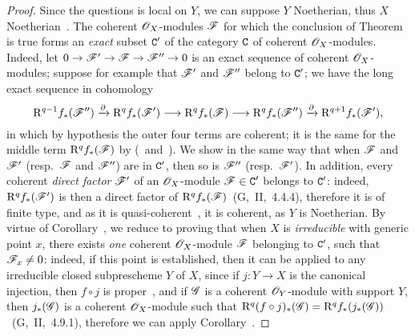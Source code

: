 \begin{proof}
Since the questions is local on $Y$, we can suppose $Y$ Noetherian, thus $X$ Noetherian~.
The coherent $\mathscr{O}_X$-modules $\mathscr{F}$ for which the conclusion of Theorem~ is true forms an \emph{exact} subset $\mathtt{C}'$ of the category $\mathtt{C}$ of coherent $\mathscr{O}_X$-modules.
Indeed, let $0\to\sh{F}'\to\sh{F}\to\sh{F}''\to 0$ is an exact sequence of coherent $\mathscr{O}_X$-modules; suppose for example that $\mathscr{F}'$ and $\mathscr{F}''$ belong to $\mathtt{C}'$; we have the long exact sequence in cohomology
\[
  \RR^{q-1}f_*(\sh{F}'')\xrightarrow{\partial}\RR^q f_*(\sh{F}')\to\RR^q f_*(\sh{F})\to\RR^q f_*(\sh{F}'')\xrightarrow{\partial}\RR^{q+1}f_*(\sh{F}'),
\]
in which by hypothesis the outer four terms are coherent; it is the same for the middle term $\mathrm{R}^q f_*(\mathscr{F})$ by (~and~).
We show in the same way that when $\mathscr{F}$ and $\mathscr{F}'$ (resp.~$\mathscr{F}$ and $\mathscr{F}''$) are in $\mathtt{C}'$, then so is $\mathscr{F}''$ (resp.~$\mathscr{F}'$).
In addition, every coherent \emph{direct factor} $\mathscr{F}'$ of an $\mathscr{O}_X$-module $\mathscr{F}\in\mathtt{C}'$ belongs to $\mathtt{C}'$: indeed, $\mathrm{R}^q f_*(\mathscr{F}')$ is then a direct factor of $\mathrm{R}^q f_*(\mathscr{F})$~(G,~II,~4.4.4), therefore it is of finite type, and as it is quasi-coherent~, it is coherent, as $Y$ is Noetherian.
By virtue of Corollary~, we reduce to proving that when $X$ is \emph{irreducible} with generic point $x$, there exists \emph{one} coherent $\mathscr{O}_X$-module $\mathscr{F}$ belonging to $\mathtt{C}'$, such that $\mathscr{F}_x\neq 0$: indeed, if this point is established, then it can be applied to any irreducible closed subprescheme $Y$ of $X$, since if $j:Y\to X$ is the canonical injection, then $f\circ j$ is proper~, and if $\mathscr{G}$ is a coherent $\mathscr{O}_Y$-module with support $Y$, then $j_*(\mathscr{G})$ is a coherent $\mathscr{O}_X$-module such that $\mathrm{R}^q(f\circ j)_*(\mathscr{G})=\mathrm{R}^q f_*(j_*(\mathscr{G}))$~(G,~II,~4.9.1), therefore we can apply Corollary~.


\end{proof}
